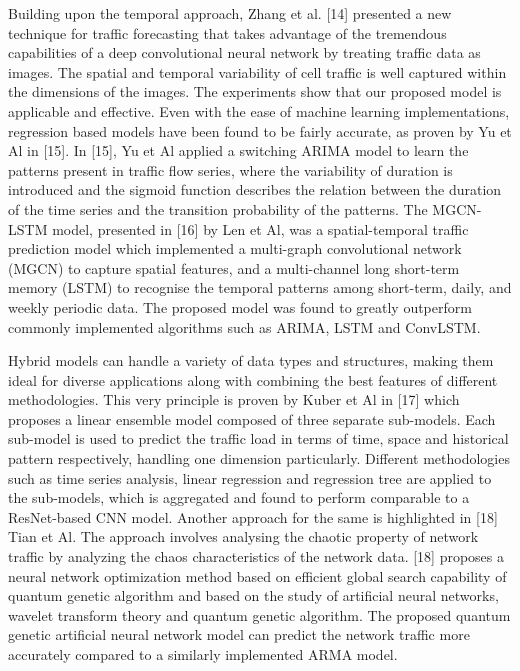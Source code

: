 \documentclass[conference]{IEEEtran}
\begin{document}
Building upon the temporal approach, Zhang et al. [14] presented a new technique for traffic forecasting that takes advantage of the tremendous capabilities of a deep convolutional neural network by treating traffic data as images. The spatial and temporal variability of cell traffic is well captured within the dimensions of the images. The experiments show that our proposed model is applicable and effective. Even with the ease of machine learning implementations, regression based models have been found to be fairly accurate, as proven by Yu et Al in [15]. In [15], Yu et Al applied a switching ARIMA model to learn the patterns present in traffic flow series, where the variability of duration is introduced and the sigmoid function describes the relation between the duration of the time series and the transition probability of the patterns. The MGCN-LSTM model, presented in [16] by Len et Al, was a spatial-temporal traffic prediction model which implemented a multi-graph convolutional network (MGCN) to capture spatial features, and a multi-channel long short-term memory (LSTM) to recognise the temporal patterns among short-term, daily, and weekly periodic data. The proposed model was found to greatly outperform commonly implemented algorithms such as ARIMA, LSTM and ConvLSTM.

Hybrid models can handle a variety of data types and structures, making them ideal for diverse applications along with combining the best features of different methodologies. This very principle is proven by Kuber et Al in [17] which proposes a linear ensemble model composed of three separate sub-models. Each sub-model is used to predict the traffic load in terms of time, space and historical pattern respectively, handling one dimension particularly. Different methodologies such as time series analysis, linear regression and regression tree are applied to the sub-models, which is aggregated and found to perform comparable to a ResNet-based CNN model. Another approach for the same is highlighted in [18] Tian et Al. The approach involves analysing the chaotic property of network traffic by analyzing the chaos characteristics of the network data. [18] proposes a neural network optimization method based on efficient global search capability of quantum genetic algorithm and based on the study of artificial neural networks, wavelet transform theory and quantum genetic algorithm. The proposed quantum genetic artificial neural network model can predict the network traffic more accurately compared to a similarly implemented ARMA model.\\
\end{document}
